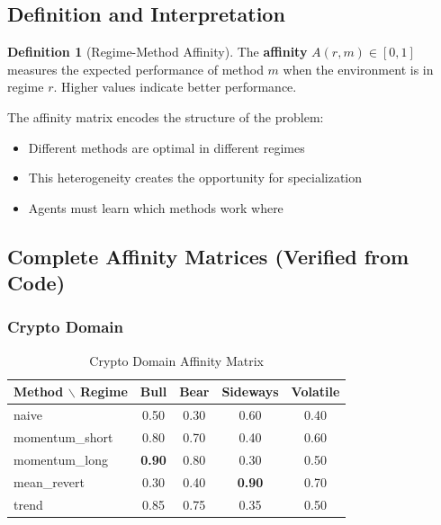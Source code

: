 \documentclass[11pt,a4paper]{article}
\theoremstyle{definition}
\newtheorem{definition}{Definition}[section]
\theoremstyle{plain}
\begin{document}
\subsection{Definition and Interpretation}

\begin{definition}[Regime-Method Affinity]
The \textbf{affinity} $A(r, m) \in [0, 1]$ measures the expected performance of method $m$ when the environment is in regime $r$. Higher values indicate better performance.
\end{definition}

\begin{keypoint}
The affinity matrix encodes the structure of the problem:
\begin{itemize}
    \item Different methods are optimal in different regimes
    \item This heterogeneity creates the opportunity for specialization
    \item Agents must learn which methods work where
\end{itemize}
\end{keypoint}

\subsection{Complete Affinity Matrices (Verified from Code)}

\subsubsection{Crypto Domain}

\begin{table}[h]
\centering
\caption{Crypto Domain Affinity Matrix}
\begin{tabular}{l|cccc}
\toprule
Method $\backslash$ Regime & Bull & Bear & Sideways & Volatile \\
\midrule
naive & 0.50 & 0.30 & 0.60 & 0.40 \\
momentum\_short & 0.80 & 0.70 & 0.40 & 0.60 \\
momentum\_long & \textbf{0.90} & 0.80 & 0.30 & 0.50 \\
mean\_revert & 0.30 & 0.40 & \textbf{0.90} & 0.70 \\
trend & 0.85 & 0.75 & 0.35 & 0.50 \\
\bottomrule
\end{tabular}
\end{table}
\end{document}
